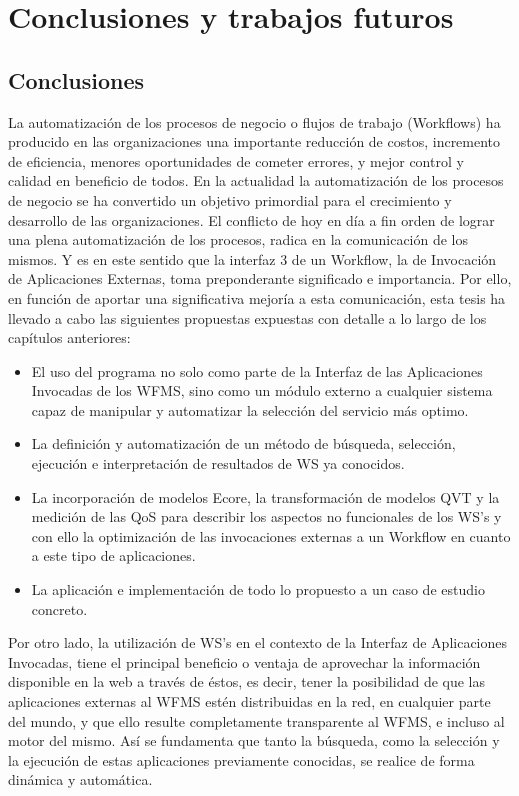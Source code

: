 \chapter{Conclusiones y trabajos futuros}
\label{Conclusiones y trabajos futuros}

\section{Conclusiones}


La automatización de los procesos de negocio o flujos de trabajo (Workflows) ha producido en las organizaciones una importante reducción de costos, incremento de eficiencia, menores oportunidades de cometer errores, y mejor control y calidad en beneficio de todos. En la actualidad la automatización de los procesos de negocio se ha convertido un objetivo primordial para el crecimiento y desarrollo de las organizaciones. El conflicto de hoy en día a fin orden de lograr una plena automatización de los procesos, radica en la comunicación de los mismos. Y es en este sentido que la interfaz 3 de un Workflow, la de Invocación de Aplicaciones Externas, toma preponderante significado e importancia. Por ello, en función de aportar una significativa mejoría a esta comunicación, esta tesis ha llevado a cabo las siguientes propuestas expuestas con detalle a lo largo de los capítulos anteriores:

\begin{itemize}
	\item El uso del programa no solo como parte de la Interfaz de las Aplicaciones Invocadas de los WFMS, sino como un módulo externo a cualquier sistema capaz de manipular y automatizar la selección del servicio más optimo.
	\item La definición y automatización de un método de búsqueda, selección, ejecución e interpretación de resultados de WS ya conocidos.
	\item La incorporación de modelos Ecore, la transformación de modelos QVT y la medición de las QoS para describir los aspectos no funcionales de los WS's y con ello la optimización de las invocaciones externas a un Workflow en cuanto a este tipo de aplicaciones.	
	\item La aplicación e implementación de todo lo propuesto a un caso de estudio concreto.
\end{itemize}

Por otro lado, la utilización de WS's en el contexto de la Interfaz de Aplicaciones Invocadas, tiene el principal beneficio o ventaja de aprovechar la información disponible en la web a través de éstos, es decir, tener la posibilidad de que las aplicaciones externas al WFMS estén distribuidas en la red, en cualquier parte del mundo, y que ello resulte completamente transparente al WFMS, e incluso al motor del mismo. Así se fundamenta que tanto la búsqueda, como la selección y la ejecución de estas aplicaciones previamente conocidas, se realice de forma dinámica y automática.\\

